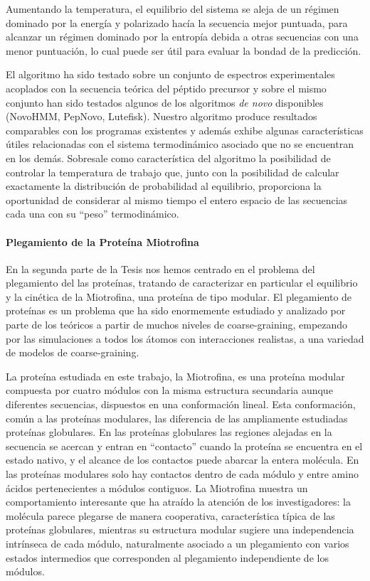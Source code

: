 Aumentando la temperatura, el equilibrio del sistema se aleja
de un régimen dominado por la energía y polarizado hacía la secuencia mejor
puntuada, para alcanzar un régimen dominado por la entropía debida a otras
secuencias con una menor puntuación, lo cual puede ser útil para evaluar la bondad de la predicción.

El algoritmo ha sido testado sobre un conjunto de espectros experimentales 
acoplados con la secuencia teórica del péptido precursor y sobre el mismo
conjunto han sido testados algunos de los algoritmos \emph{de novo} disponibles
(NovoHMM, PepNovo, Lutefisk).
Nuestro algoritmo produce resultados comparables con los programas existentes
y además exhibe algunas características útiles relacionadas con el sistema 
termodinámico asociado que no se encuentran en los demás.
Sobresale como característica del algoritmo
la posibilidad de controlar la temperatura de trabajo que,
junto con la posibilidad de calcular exactamente la distribución de
probabilidad al equilibrio, proporciona la oportunidad de considerar al
mismo tiempo el entero espacio de las secuencias cada una con su ``peso''
termodinámico.

\paragraph{Plegamiento de la Prote\'ina Miotrofina}
En la segunda parte de la Tesis nos hemos centrado en el problema del
plegamiento del las proteínas, tratando de caracterizar en particular el
equilibrio y la cinética de la Miotrofina, una proteína de tipo modular.
El plegamiento de proteínas es un problema que ha sido enormemente estudiado y
analizado por parte de los teóricos a partir de muchos niveles de
coarse-graining, empezando por
las simulaciones a todos los átomos con interacciones realistas, a una variedad
de modelos de coarse-graining.

La proteína estudiada en este trabajo, la Miotrofina, es una proteína modular
compuesta por cuatro módulos con la misma estructura secundaria aunque
diferentes secuencias, dispuestos en una conformación lineal.
Esta conformación, común a las proteínas modulares, las diferencia de las ampliamente estudiadas
proteínas globulares. 
En las proteínas globulares las
regiones alejadas en la secuencia se acercan y entran en ``contacto'' cuando la
proteína se encuentra en el estado nativo, y el alcance de los contactos puede
abarcar la entera molécula.
En las proteínas modulares solo hay contactos dentro de cada
módulo y entre amino ácidos pertenecientes a módulos contiguos.
La Miotrofina muestra un comportamiento interesante que ha atraído la atención
de los investigadores: la molécula parece plegarse de manera cooperativa,
característica típica de las proteínas globulares, mientras su estructura
modular sugiere una independencia intrínseca de cada módulo, naturalmente
asociado a un plegamiento con varios estados
intermedios que corresponden al plegamiento independiente de los módulos.


